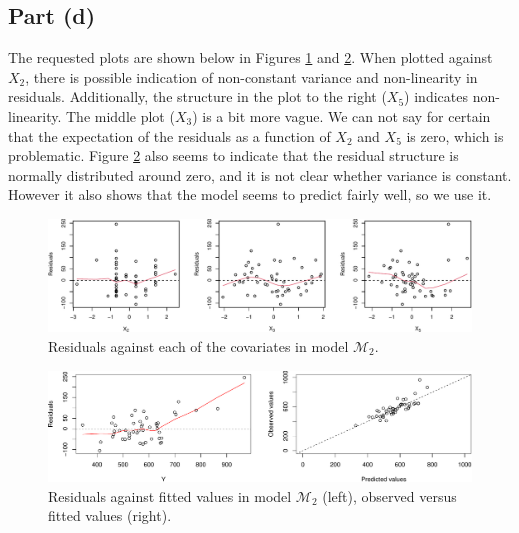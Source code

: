\documentclass[
]{homework}
\begin{document}
\subsection{Part (d)}\label{part-d-1}

The requested plots are shown below in Figures \ref{fig:ex4-resids-vs-cov} and \ref{fig:ex4-resids-vs-fit}. When plotted against \(X_2\), there is possible indication of non-constant variance and non-linearity in residuals.
Additionally, the structure in the plot to the right (\(X_5\)) indicates non-linearity. The middle plot (\(X_3\)) is a bit more vague. We can not say for certain that the expectation of the residuals as a function of \(X_2\) and \(X_5\) is zero, which is problematic. Figure \ref{fig:ex4-resids-vs-fit} also seems to indicate that the residual structure is normally distributed around zero, and it is not clear whether variance is constant. However it also shows that the model seems to predict fairly well, so we use it.

\begin{figure}

{\centering \includegraphics[width=1\linewidth]{finalexam_files/figure-latex/ex4-resids-vs-cov-1} 

}

\caption{Residuals against each of the covariates in model $\mathcal M_2$.}\label{fig:ex4-resids-vs-cov}
\end{figure}

\begin{figure}

{\centering \includegraphics[width=1\linewidth]{finalexam_files/figure-latex/ex4-resids-vs-fit-1} 

}

\caption{Residuals against fitted values in model $\mathcal M_2$ (left), observed versus fitted values (right).}\label{fig:ex4-resids-vs-fit}
\end{figure}
\end{document}
